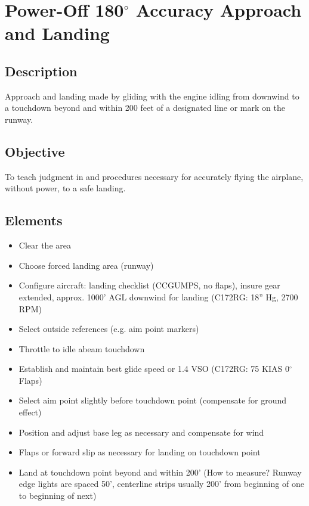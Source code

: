 \section{Power-Off 180$^\circ$ Accuracy Approach and Landing}

\subsection{Description}

Approach and landing made by gliding with the engine idling from downwind to a
touchdown beyond and within 200 feet of a designated line or mark on the
runway.

\subsection{Objective}

To teach judgment in and procedures necessary for accurately flying the
airplane, without power, to a safe landing.

\subsection{Elements}

\begin{itemize}
  \item Clear the area
  \item Choose forced landing area (runway)
  \item Configure aircraft: landing checklist (CCGUMPS, no flaps), insure gear extended, approx. 1000’ AGL downwind for landing (C172RG: 18'' Hg, 2700 RPM)
  \item Select outside references (e.g. aim point markers)
  \item Throttle to idle abeam touchdown
  \item Establish and maintain best glide speed or 1.4 VSO (C172RG: 75 KIAS
    0$^\circ$ Flaps)
  \item Select aim point slightly before touchdown point (compensate for ground
    effect)
  \item Position and adjust base leg as necessary and compensate for wind
  \item Flaps or forward slip as necessary for landing on touchdown point
  \item Land at touchdown point beyond and within 200' (How to measure? Runway
    edge lights are spaced 50', centerline strips usually 200' from beginning
    of one to beginning of next)
\end{itemize}

